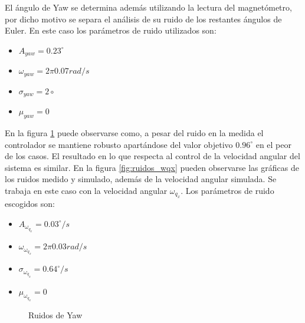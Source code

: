\documentclass[main]{subfiles}
\begin{document}
El \'angulo de Yaw se determina adem\'as utilizando la lectura del magnet\'ometro, por dicho motivo se separa el an\'alisis de su ruido de los restantes \'angulos de Euler. En este caso los par\'ametros de ruido utilizados son:

\begin{itemize}
\item $A_{yaw} = 0.23^\circ$
\item $\omega_{yaw} = 2\pi 0.07 rad/s$
\item $\sigma_{yaw} = 2\circ$
\item $\mu_{yaw} = 0$
\end{itemize}

En la figura \ref{fig:ruidos_yaw} puede observarse como, a pesar del ruido en la medida el controlador se mantiene robusto apart\'andose del valor objetivo $0.96^\circ$ en el peor de los casos. El resultado en lo que respecta al control de la velocidad angular del sistema es similar. En la figura \ref{fig:ruidos_wqx} pueden observarse las gr\'aficas de los ruidos medido y simulado, adem\'as de la velocidad angular simulada. Se trabaja en este caso con la velocidad angular $\omega_{q_x}$. Los par\'ametros de ruido escogidos son:
\begin{itemize}
\item $A_{\omega_{q_x}} = 0.03^\circ/s$
\item $\omega_{\omega_{q_x}} = 2\pi 0.03 rad/s$
\item $\sigma_{\omega_{q_x}} = 0.64^\circ/s$
\item $\mu_{\omega_{q_x}} = 0$
\end{itemize}
\begin{figure}[h!]
  \centering
  \caption{Ruidos de Yaw}
  \label{fig:ruidos_yaw}
\end{figure}
\end{document}
